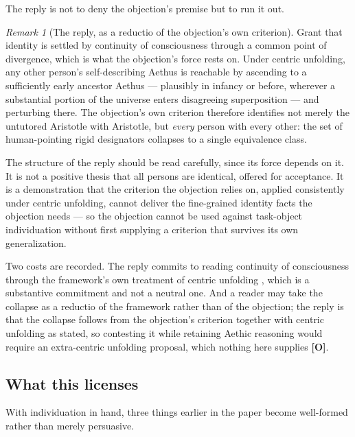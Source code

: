 \documentclass[11pt]{article}
\numberwithin{equation}{section}
\theoremstyle{plain}
\theoremstyle{definition}
\theoremstyle{remark}
\newtheorem{remark}[theorem]{Remark}
\begin{document}
The reply is not to deny the objection's premise but to run it out.

\begin{remark}[The reply, as a reductio of the objection's own criterion]
\label{to:rem:reductio}
Grant that identity is settled by continuity of consciousness through a
common point of divergence, which is what the objection's force rests
on. Under centric unfolding, any other person's self-describing Aethus
is reachable by ascending to a sufficiently early ancestor Aethus ---
plausibly in infancy or before, wherever a substantial portion of the
universe enters disagreeing superposition --- and perturbing there. The
objection's own criterion therefore identifies not merely the untutored
Aristotle with Aristotle, but \emph{every} person with every other: the
set of human-pointing rigid designators collapses to a single
equivalence class.

The structure of the reply should be read carefully, since its force
depends on it. It is not a positive thesis that all persons are
identical, offered for acceptance. It is a demonstration that the
criterion the objection relies on, applied consistently under centric
unfolding, cannot deliver the fine-grained identity facts the objection
needs --- so the objection cannot be used against task-object
individuation without first supplying a criterion that survives its own
generalization.

Two costs are recorded. The reply commits to reading continuity of
consciousness through the framework's own treatment of centric unfolding
\cite{Aethus}, which is a substantive commitment and not a neutral one.
And a reader may take the collapse as a reductio of the framework rather
than of the objection; the reply is that the collapse
follows from the objection's criterion together with centric unfolding
as stated, so contesting it while retaining Aethic reasoning would
require an extra-centric unfolding proposal, which nothing here
supplies \textbf{[O]}.
\end{remark}

\subsection{What this licenses}\label{to:sub:licenses}

With individuation in hand, three things earlier in the paper become
well-formed rather than merely persuasive.
\end{document}
